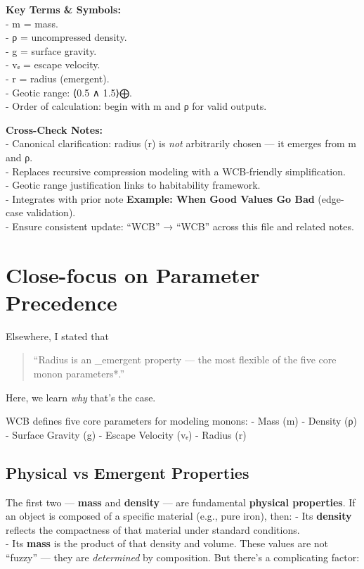 \documentclass[
  letterpaper,
]{book}
\begin{document}
\textbf{Key Terms \& Symbols:}\\
- m = mass.\\
- ρ = uncompressed density.\\
- g = surface gravity.\\
- vₑ = escape velocity.\\
- r = radius (emergent).\\
- Geotic range: ⟨0.5 ∧ 1.5⟩⨁.\\
- Order of calculation: begin with m and ρ for valid outputs.

\textbf{Cross-Check Notes:}\\
- Canonical clarification: radius (r) is \emph{not} arbitrarily chosen
--- it emerges from m and ρ.\\
- Replaces recursive compression modeling with a WCB-friendly
simplification.\\
- Geotic range justification links to habitability framework.\\
- Integrates with prior note \textbf{Example: When Good Values Go Bad}
(edge-case validation).\\
- Ensure consistent update: ``WCB'' → ``WCB'' across this file and
related notes.

\chapter{Close-focus on Parameter
Precedence}\label{close-focus-on-parameter-precedence}

Elsewhere, I stated that

\begin{quote}
``Radius is an \_emergent property --- the most flexible of the five
core monon parameters*.''
\end{quote}

Here, we learn \emph{why} that's the case.

WCB defines five core parameters for modeling monons: - Mass (m) -
Density (ρ) - Surface Gravity (g) - Escape Velocity (vₑ) - Radius (r)

\section{Physical vs Emergent
Properties}\label{physical-vs-emergent-properties}

The first two --- \textbf{mass} and \textbf{density} --- are fundamental
\textbf{physical properties}. If an object is composed of a specific
material (e.g., pure iron), then: - Its \textbf{density} reflects the
compactness of that material under standard conditions.\\
- Its \textbf{mass} is the product of that density and volume. These
values are not ``fuzzy'' --- they are \emph{determined} by composition.
But there's a complicating factor:
\end{document}
